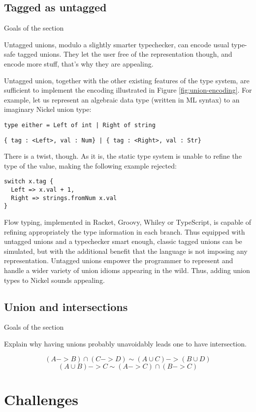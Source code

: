 \documentclass{article}
\begin{document}
\subsection{Tagged as untagged}
\color{red}Goals of the section

Untagged unions, modulo a slightly smarter typechecker, can encode usual type-safe
tagged unions. They let the user free of the representation though, and encode
more stuff, that's why they are appealing.\vspace{0.5cm}\color{black}

Untagged union, together with the other existing features of the type system,
are sufficient to implement the encoding illustrated in Figure
\ref{fig:union-encoding}. For example, let us represent an algebraic data type
(written in ML syntax) to an imaginary Nickel union type:

\begin{lstlisting}
type either = Left of int | Right of string
\end{lstlisting}

\begin{lstlisting}
{ tag : <Left>, val : Num} | { tag : <Right>, val : Str}
\end{lstlisting}

There is a twist, though. As it is, the static type system is unable to refine
the type of the value, making the following example rejected:

\begin{lstlisting}
switch x.tag {
  Left => x.val + 1,
  Right => strings.fromNum x.val
}
\end{lstlisting}

Flow typing, implemented in Racket\cite{FlowTypingRacket1, FlowTypingRacket2},
Groovy\cite{FlowTypingGroovy}, Whiley\cite{FlowTypingWhiley} or
TypeScript\cite{FlowTypingTypeScript}, is capable of refining appropriately the
type information in each branch. Thus equipped with untagged unions and a
typechecker smart enough, classic tagged unions can be simulated, but with the
additional benefit that the language is not imposing any representation.
Untagged unions empower the programmer to represent and handle a wider variety
of union idioms appearing in the wild.  Thus, adding union types to Nickel
sounds appealing.

\subsection{Union and intersections}
\color{red}Goals of the section

Explain why having unions probably unavoidably leads one to have intersection.\vspace{0.5cm}\color{black}

$$(A -> B) \cap (C -> D) \sim (A \cup C) -> (B \cup D)$$
$$(A \cup B) -> C \sim (A -> C) \cap (B -> C)$$


\section{Challenges}


\printbibliography
\end{document}

